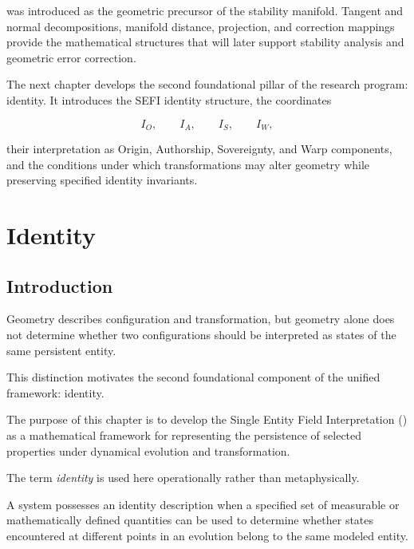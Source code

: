 \documentclass[12pt,oneside]{book}
\newcommand{\SEFI}{\mathrm{SEFI}}
\begin{document}
was introduced as the geometric precursor of the stability
manifold. Tangent and normal decompositions, manifold distance,
projection, and correction mappings provide the mathematical
structures that will later support stability analysis and
geometric error correction.

The next chapter develops the second foundational pillar of the
research program: identity. It introduces the SEFI identity
structure, the coordinates

\begin{equation}
    I_O,
    \qquad
    I_A,
    \qquad
    I_S,
    \qquad
    I_W,
\end{equation}

their interpretation as Origin, Authorship, Sovereignty, and
Warp components, and the conditions under which transformations
may alter geometry while preserving specified identity
invariants.

\chapter{Identity}
\label{chap:identity}


\section{Introduction}
\label{sec:identity-introduction}

Geometry describes configuration and transformation, but
geometry alone does not determine whether two configurations
should be interpreted as states of the same persistent entity.

This distinction motivates the second foundational component of
the unified framework: identity.

The purpose of this chapter is to develop the Single Entity
Field Interpretation (\SEFI) as a mathematical framework for
representing the persistence of selected properties under
dynamical evolution and transformation.

The term \emph{identity} is used here operationally rather than
metaphysically.

A system possesses an identity description when a specified set
of measurable or mathematically defined quantities can be used
to determine whether states encountered at different points in
an evolution belong to the same modeled entity.
\end{document}
